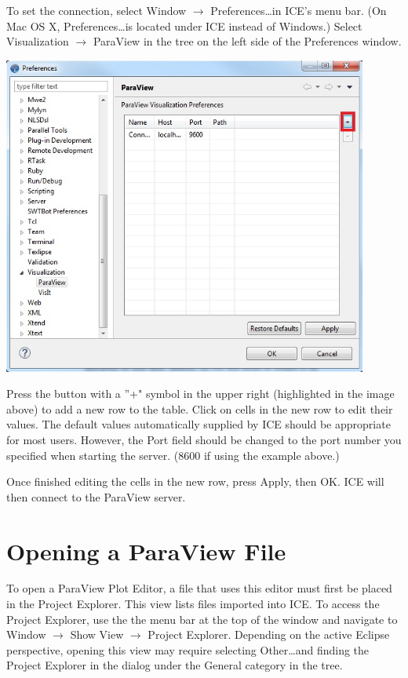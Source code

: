 \documentclass{article}
\begin{document}
To set the connection, select Window $\rightarrow$ Preferences\ldots in ICE's
menu bar. (On Mac OS X, Preferences\ldots is located under ICE instead of
Windows.) Select Visualization $\rightarrow$ ParaView in the tree on the left
side of the Preferences window.

\begin{center}
\includegraphics[width=12cm]{images/ParaViewPreferencePage_ICE}
\end{center}

Press the button with a ''+" symbol in the upper right (highlighted in the image
above) to add a new row to the table. Click on cells in the new row to edit
their values. The default values automatically supplied by ICE should be
appropriate for most users. However, the Port field should be changed to the
port number you specified when starting the server. (8600 if using the example
above.)

Once finished editing the cells in the new row, press Apply, then OK. ICE will
then connect to the ParaView server.

\section{Opening a ParaView File} 

To open a ParaView Plot Editor, a file that uses this editor must first be
placed in the Project Explorer. This view lists files imported into ICE. To
access the Project Explorer, use the the menu bar at the top of the window and
navigate to Window $\rightarrow$ Show View $\rightarrow$ Project Explorer.
Depending on the active Eclipse perspective, opening this view may require
selecting Other\ldots and finding the Project Explorer in the dialog under the
General category in the tree.
\end{document}
